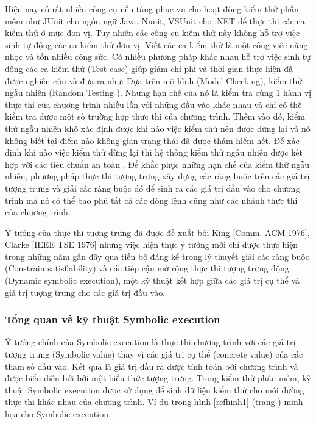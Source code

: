 \documentclass[12pt,a4paper]{article}
\begin{document}
\indent Hiện nay có rất nhiều công cụ nền tảng phục vụ cho hoạt động kiểm thử phần mềm như JUnit cho ngôn ngữ Java, Nunit, VSUnit cho .NET để thực thi các ca kiểm thử ở mức đơn vị. Tuy nhiên các công cụ kiểm thử này không hỗ trợ việc sinh tự động các ca kiểm thử đơn vị. Viết các ca kiểm thử là một công việc nặng nhọc và tốn nhiều công sức. Có nhiều phương pháp khác nhau hỗ trợ việc sinh tự động các ca kiểm thử (Test case) giúp giảm chi phí và thời gian thực hiện đã được nghiên cứu và đưa ra như: Dựa trên mô hình (Model Checking), kiểm thử ngẫu nhiên (Random Testing \cite{boyer1975select}). Nhưng hạn chế của nó là kiểm tra cùng 1 hành vị thực thi của chương trình nhiều lần với những đầu vào khác nhau và chỉ có thể kiểm tra được một số trường hợp thực thi của chương trình. Thêm vào đó, kiểm thử ngẫu nhiên khó xác định được khi nào việc kiểm thử nên được dừng lại và nó không biết tại điểm nào không gian trạng thái đã được thám hiểm hết. Để xác định khi nào việc kiểm thử dừng lại thì hệ thống kiểm thử ngẫu nhiên được kết hợp với các tiêu chuẩn an toàn \cite{zhu1997software}. Để khắc phục những hạn chế của kiểm thử ngẫu nhiên, phương pháp thực thi tượng trưng xây dựng các ràng buộc trên các giá trị tượng trưng và giải các ràng buộc đó để sinh ra các giá trị đầu vào cho chương trình mà nó có thể bao phủ tất cả các dòng lệnh cũng như các nhánh thực thi của chương trình.

\indent Ý tưởng của thực thi tượng trưng đã được đề xuất bởi King [Comm. ACM 1976], Clarke [IEEE TSE 1976] nhưng việc hiện thực ý tưởng mới chỉ được thực hiện trong những năm gần đây qua tiến bộ đáng kể trong lý thuyết giải các ràng buộc (Constrain satisfiability) \cite{de2011satisfiability} và các tiếp cận mở rộng thực thi tượng trưng động (Dynamic symbolic execution), một kỹ thuật kết hợp giữa các giá trị cụ thể và giá trị 
tượng trưng cho các giá trị đầu vào.

\subsubsection{Tổng quan về kỹ thuật Symbolic execution}
Ý tưởng chính của Symbolic execution là thực thi chương trình với các giá trị tượng trưng (Symbolic value) thay vì các giá trị cụ thể (concrete value) của các tham số đầu vào. Kết quả là giá trị đầu ra được tính toán bởi chương trình và được biểu diễn bởi bởi một biểu thức tượng trưng. Trong kiểm thử phần mềm, kỹ thuật Symbolic execution được sử dụng để sinh dữ liệu kiểm thử cho mỗi đường thực thi khác nhau của chương trình. Ví dụ trong hình \ref{refhinh1} (trang \pageref{refhinh1}) minh họa cho Symbolic execution.
\end{document}
